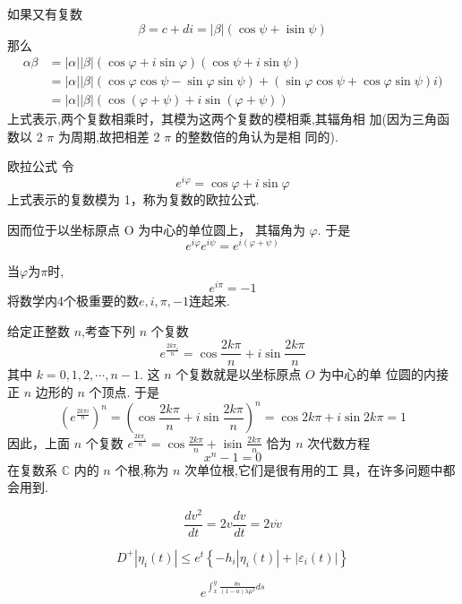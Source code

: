\documentclass[13pt,fontset=mac]{ctexbeamer}
\begin{document}
\begin{frame}
	如果又有复数
	\[
	\beta=c+d {i}=|\beta|(\cos \psi+\operatorname{isin} \psi)
	\]
	那么
	\[
	\begin{aligned}
		\alpha \beta &=|\alpha||\beta|(\cos \varphi+i \operatorname{sin} \varphi)(\cos \psi+ i \operatorname{sin} \psi) \\
		&=|\alpha||\beta|(\cos \varphi \cos \psi-\sin \varphi \sin \psi)+(\sin \varphi \cos \psi+\cos \varphi \sin \psi) {i}) \\
		&=|\alpha||\beta|(\cos (\varphi+\psi)+i \operatorname{sin}(\varphi+\psi))
	\end{aligned}
	\]
	上式表示,两个复数相乘时，其模为这两个复数的模相乘,其辐角相 加(因为三角函数以 2 $\pi$ 为周期,故把相差 2 $\pi$ 的整数倍的角认为是相 同的).
\end{frame}

\begin{frame}{欧拉公式}
	令
	\[
	{e}^{{i} \varphi}=\cos \varphi+{i} \sin \varphi
	\]
	上式表示的复数模为 1，称为复数的\alert{欧拉公式}. 
	
	因而位于以坐标原点 O 为中心的单位圆上， 其辐角为 $\varphi$. 于是
	\[
	{e}^{{i} \varphi} {e}^{{i} \psi}={e}^{{i}(\varphi+\psi)}
	\]
	
	
	当$\varphi$为$\pi$时, $$ e^{i\pi }=-1$$
	将数学内4个极重要的数$e, i, \pi, -1 $连起来.
\end{frame}



\begin{frame}
	给定正整数 $n$,考查下列 $n$ 个复数
	\[
	{e}^{\frac{2 k \pi_{{i}}}{n}}=\cos \frac{2 k \pi}{n}+i\operatorname{sin} \frac{2 k \pi}{n}
	\]
	其中 $k=0,1,2, \cdots, n-1.$ 这 $n$ 个复数就是以坐标原点 $O$ 为中心的单 位圆的内接正 $n$ 边形的 $n$ 个顶点.
	于是
	\[
	\left({e}^{\frac{2 {k\pi i}}{n}}\right)^{n}=\left(\cos \frac{2 k \pi}{n}+i \operatorname{sin} \frac{2 k \pi}{n}\right)^{n}=\cos 2 k \pi+{i} \sin 2 k \pi=1
	\]
	因此，上面 $n$ 个复数 ${e}^{\frac{2 k \pi_{{i}}}{n}}=\cos \frac{2 k \pi}{n}+$ isin $\frac{2 k \pi}{n}$ 恰为 $n$ 次代数方程 $$x^{n}-1=0$$ 在复数系 $\mathbb{C}$ 内的 $n$ 个根,称为 $n$ 次单位根,它们是很有用的工
	具，在许多问题中都会用到.
\end{frame}


\begin{frame}
\begin{equation}
	\frac{d v^{2}}{d t}=2 v \frac{d v}{d t}=2 v \dot{v}
\end{equation}

\begin{equation}
	D^{+}\left|\eta_{i}(t)\right| \leq e^{t}\left\{-h_{i}\left|\eta_{i}(t)\right|+\left|\varepsilon_{i}(t)\right|\right\}
\end{equation}

\begin{equation}
	e^{\int_{x}^{y} \frac{\theta s}{(1-a) \lambda \mu^{2}} d s}
\end{equation}

\end{frame}
\end{document}
